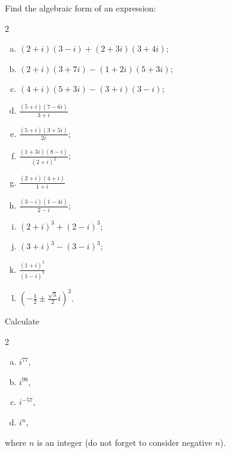 \begin{problem}
Find the algebraic form of an expression:
\begin{multicols}{2}
\begin{enumerate}[a)]
\item $(2+i)(3-i)+(2+3 i)(3+4 i)$;

\item $(2+i)(3+7 i)-(1+2 i)(5+3 i)$;

\item $(4+i)(5+3 i)-(3+i)(3-i)$;

\item $\frac{(5+i)(7-6 i)}{3+i}$

\item $\frac{(5+i)(3+5 i)}{2 i}$;

\item $\frac{(1+3 i)(8-i)}{(2+i)^2}$;

\item $\frac{(2+i)(4+i)}{1+i}$

\item $\frac{(3-i)(1-4 i)}{2-i}$;

\item $(2+i)^3+(2-i)^3$;

\item $(3+i)^3-(3-i)^3$;

\item $\frac{(1+i)^5}{(1-i)^3}$

\item $\left(-\frac{1}{2} \pm \frac{\sqrt{3}}{2} i\right)^3$.
\end{enumerate}
\end{multicols}
\end{problem}


\begin{problem}
Calculate 
\begin{multicols}{2}
\begin{enumerate}[a) ]
    \item $i^{77}$, 
    \item $i^{98}$, 
    \item $i^{-57}$,
    \item $i^n$,
\end{enumerate}
\end{multicols}
where $n$ is an integer (do not forget to consider negative $n$).
\end{problem}


